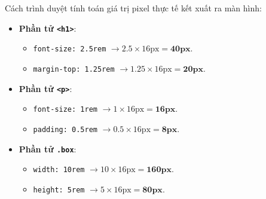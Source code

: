 \documentclass[11pt,oneside]{book}
\newcommand{\codeinline}[1]{\textcolor{accentOrange}{\texttt{#1}}}
\begin{document}
Cách trình duyệt tính toán giá trị pixel thực tế kết xuất ra màn hình:
\begin{itemize}[leftmargin=1.5em, itemsep=2pt, parsep=0pt]
    \item \textbf{Phần tử \codeinline{<h1>}}:
    \begin{itemize}[leftmargin=1.2em]
        \item \codeinline{font-size: 2.5rem} $\rightarrow 2.5 \times 16\text{px} = \mathbf{40\text{px}}$.
        \item \codeinline{margin-top: 1.25rem} $\rightarrow 1.25 \times 16\text{px} = \mathbf{20\text{px}}$.
    \end{itemize}
    \item \textbf{Phần tử \codeinline{<p>}}:
    \begin{itemize}[leftmargin=1.2em]
        \item \codeinline{font-size: 1rem} $\rightarrow 1 \times 16\text{px} = \mathbf{16\text{px}}$.
        \item \codeinline{padding: 0.5rem} $\rightarrow 0.5 \times 16\text{px} = \mathbf{8\text{px}}$.
    \end{itemize}
    \item \textbf{Phần tử \codeinline{.box}}:
    \begin{itemize}[leftmargin=1.2em]
        \item \codeinline{width: 10rem} $\rightarrow 10 \times 16\text{px} = \mathbf{160\text{px}}$.
        \item \codeinline{height: 5rem} $\rightarrow 5 \times 16\text{px} = \mathbf{80\text{px}}$.
    \end{itemize}
\end{itemize}
\end{document}
